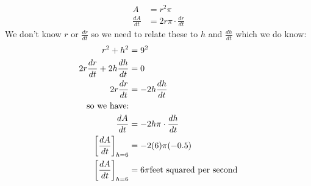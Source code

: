 \documentclass[nooutcomes]{ximera}
\begin{document}
\begin{problem}
\begin{freeResponse}
	\begin{align*}
	A&=r^2\pi\\
	\frac{dA}{dt}&=2r\pi \cdot \frac{dr}{dt} 
	\end{align*}
	We don't know $r$ or $\frac{dr}{dt}$ so we need to relate these to $h$ and $\frac{dh}{dt}$ which we do know:\\
	\begin{align*}
	r^2+h^2&=9^2\\
	2r\frac{dr}{dt}+2h\frac{dh}{dt}&=0\\
	2r\frac{dr}{dt}&=-2h\frac{dh}{dt}\\
	\text{so we have:}&\\
	\frac{dA}{dt}&=-2h\pi \cdot \frac{dh}{dt} \\
	\bigg[ \frac{dA}{dt} \bigg]_{h=6}&=-2(6)\pi (-0.5)\\
	\bigg[ \frac{dA}{dt} \bigg]_{h=6}&=6\pi \text{feet squared per second}
	\end{align*}

\end{freeResponse}
\end{problem}
\end{document}
